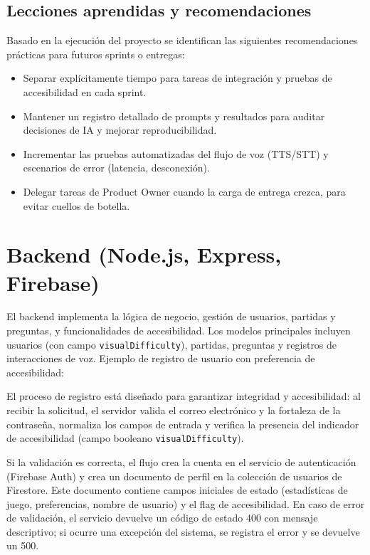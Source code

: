 \documentclass[12pt]{article}
\begin{document}
\subsection{Lecciones aprendidas y recomendaciones}
Basado en la ejecución del proyecto se identifican las siguientes recomendaciones prácticas para futuros sprints o entregas:
\begin{itemize}
  \item Separar explícitamente tiempo para tareas de integración y pruebas de accesibilidad en cada sprint.
  \item Mantener un registro detallado de prompts y resultados para auditar decisiones de IA y mejorar reproducibilidad.
  \item Incrementar las pruebas automatizadas del flujo de voz (TTS/STT) y escenarios de error (latencia, desconexión).
  \item Delegar tareas de Product Owner cuando la carga de entrega crezca, para evitar cuellos de botella.
\end{itemize}


\section{Backend (Node.js, Express, Firebase)}
El backend implementa la lógica de negocio, gestión de usuarios, partidas y preguntas, y funcionalidades de accesibilidad. Los modelos principales incluyen usuarios (con campo \texttt{visualDifficulty}), partidas, preguntas y registros de interacciones de voz. Ejemplo de registro de usuario con preferencia de accesibilidad:

El proceso de registro está diseñado para garantizar integridad y accesibilidad: al recibir la solicitud, el servidor valida el correo electrónico y la fortaleza de la contraseña, normaliza los campos de entrada y verifica la presencia del indicador de accesibilidad (campo booleano \texttt{visualDifficulty}).

Si la validación es correcta, el flujo crea la cuenta en el servicio de autenticación (Firebase Auth) y crea un documento de perfil en la colección de usuarios de Firestore. Este documento contiene campos iniciales de estado (estadísticas de juego, preferencias, nombre de usuario) y el flag de accesibilidad. En caso de error de validación, el servicio devuelve un código de estado 400 con mensaje descriptivo; si ocurre una excepción del sistema, se registra el error y se devuelve un 500.
\end{document}

